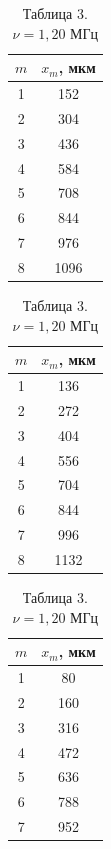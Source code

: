 \documentclass[a4paper]{article}
\begin{document}
\begin{enumerate}
\begin{table}[h!]
    \centering
    \begin{minipage}[t]{0.3\textwidth}
        \centering
        \begin{tabular}{|c|c|}
            \hline
            $m$ & $x_m$, мкм \\ \hline
            1 & 152 \\ \hline
            2 & 304 \\ \hline
            3 & 436 \\ \hline
            4 & 584 \\ \hline
            5 & 708 \\ \hline
            6 & 844 \\ \hline
            7 & 976 \\ \hline
            8 & 1096 \\ \hline
        \end{tabular}
        \caption{Таблица 1. \\$\nu = 1{,}02$ МГц}
        \label{tab:freq1}
    \end{minipage}%
    \hfill
    \begin{minipage}[t]{0.3\textwidth}
        \centering
        \begin{tabular}{|c|c|}
            \hline
            $m$ & $x_m$, мкм \\ \hline
            1 & 136 \\ \hline
            2 & 272 \\ \hline
            3 & 404 \\ \hline
            4 & 556 \\ \hline
            5 & 704 \\ \hline
            6 & 844 \\ \hline
            7 & 996 \\ \hline
            8 & 1132 \\ \hline
        \end{tabular}
        \caption{Таблица 2. \\$\nu = 1{,}095$ МГц}
        \label{tab:freq2}
    \end{minipage}%
    \hfill
    \begin{minipage}[t]{0.3\textwidth}
        \centering
        \begin{tabular}{|c|c|}
            \hline
            $m$ & $x_m$, мкм \\ \hline
            1 & 80 \\ \hline
            2 & 160 \\ \hline
            3 & 316 \\ \hline
            4 & 472 \\ \hline
            5 & 636 \\ \hline
            6 & 788 \\ \hline
            7 & 952 \\ \hline
        \end{tabular}
        \caption{Таблица 3. \\$\nu = 1{,}20$ МГц}
        \label{tab:freq3}
    \end{minipage}
\end{table}


\end{enumerate}
\end{document}
